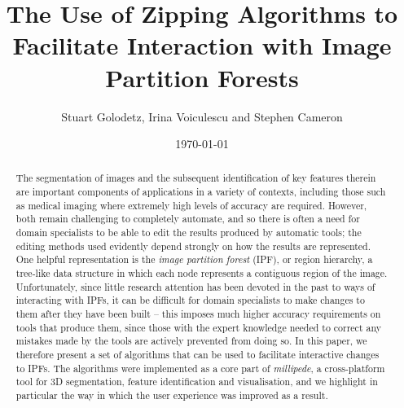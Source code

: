 \documentclass[10pt,twocolumn,twoside]{IEEEtran}
\begin{document}
\title{The Use of Zipping Algorithms to Facilitate Interaction with Image Partition Forests}
\author{Stuart Golodetz, Irina Voiculescu and Stephen Cameron}
\date{\today}
\maketitle

\begin{abstract}

\noindent The segmentation of images and the subsequent identification of key features therein are important components of applications in a variety of contexts, including those such as medical imaging where extremely high levels of accuracy are required. However, both remain challenging to completely automate, and so there is often a need for domain specialists to be able to edit the results produced by automatic tools; the editing methods used evidently depend strongly on how the results are represented. One helpful representation is the \emph{image partition forest} (IPF), or region hierarchy, a tree-like data structure in which each node represents a contiguous region of the image. Unfortunately, since little research attention has been devoted in the past to ways of interacting with IPFs, it can be difficult for domain specialists to make changes to them after they have been built -- this imposes much higher accuracy requirements on tools that produce them, since those with the expert knowledge needed to correct any mistakes made by the tools are actively prevented from doing so. In this paper, we therefore present a set of algorithms that can be used to facilitate interactive changes to IPFs. The algorithms were implemented as a core part of \emph{millipede}, a cross-platform tool for 3D segmentation, feature identification and visualisation, and we highlight in particular the way in which the user experience was improved as a result.
\end{abstract}
\end{document}
